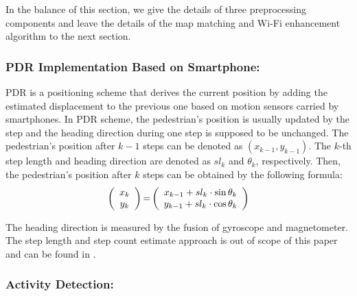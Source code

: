\documentclass{llncs}
\begin{document}
In the balance of this section, we give the details of three preprocessing components and leave the details of the map matching and Wi-Fi enhancement algorithm to the next section.

\subsubsection{PDR Implementation Based on Smartphone:}

PDR is a positioning scheme that derives the current position by adding the estimated displacement to the previous one based on motion sensors carried by smartphones. In PDR scheme, the pedestrian's position is usually updated by the step and the heading direction during one step is supposed to be unchanged. The pedestrian's position after $k-1$ steps can be denoted as $(x_{k-1},y_{k-1})$. The $k$-th step length and heading direction are denoted as $sl_k$ and $\theta_k$, respectively. Then, the pedestrian's position after $k$ steps can be obtained by the following formula:
\begin{equation}
\label{equ_pdr}
\left( {\begin{array}{*{20}{c}}
	{{x_k}}\\
	{{y_k}}
	\end{array}} \right){\rm{ = }}\left( {\begin{array}{*{20}{c}}
	{{x_{k - 1}} + s{l_k} \cdot \sin {\theta _k}}\\
	{{y_{k - 1}} + s{l_k} \cdot \cos {\theta _k}}
	\end{array}} \right)
\end{equation}


The heading direction is measured by the fusion of gyroscope and magnetometer. The step length and step count estimate approach is out of scope of this paper and can be found in \cite{wang2012no}. 

\subsubsection{Activity Detection:}
\end{document}
